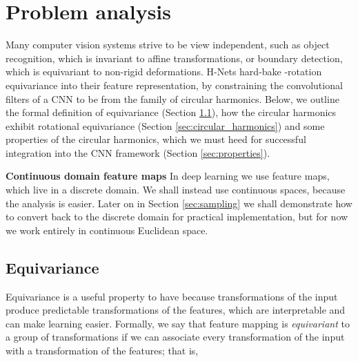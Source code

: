 \documentclass[10pt,twocolumn,letterpaper]{article}
\begin{document}
\section{Problem analysis}
Many computer vision systems strive to be view independent, such as object 
recognition, which is invariant to affine transformations, or boundary detection, 
which is equivariant to non-rigid deformations. H-Nets hard-bake -rotation
equivariance into their feature representation, by constraining the convolutional 
filters of a CNN to be from the family of circular harmonics. Below, we outline 
the formal definition of equivariance (Section \ref{sec:equivariance}), how the 
circular harmonics exhibit rotational equivariance (Section \ref{sec:circular_harmonics}) 
and some properties of the circular harmonics, which we must heed for successful
integration into the CNN framework (Section \ref{sec:properties}).

\textbf{Continuous domain feature maps}
In deep learning we use feature maps, which live in a discrete domain.
We shall instead use continuous spaces, because the analysis
is easier. Later on in Section \ref{sec:sampling} we shall demonstrate
how to convert back to the discrete domain for practical implementation,
but for now we work entirely in continuous Euclidean space.

\subsection{Equivariance}
\label{sec:equivariance}
Equivariance is a useful property to have because transformations 
 of the input produce predictable transformations  of 
the features, which are interpretable and can make learning easier.
Formally, we say that feature mapping  is \emph{equivariant} 
to a group of transformations if we can associate every transformation
 of the input  with a transformation 
 of the features; that is,
 
\end{document}

